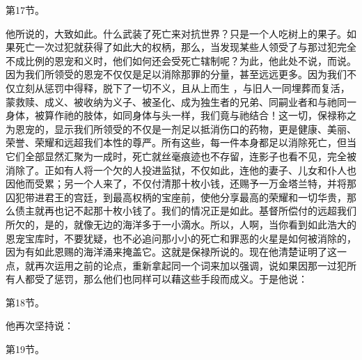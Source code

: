 第17节。 \par

他所说的，大致如此。什么武装了死亡来对抗世界？只是一个人吃树上的果子。如果死亡一次过犯就获得了如此大的权柄，那么，当发现某些人领受了与那过犯完全不成比例的恩宠和义时，他们如何还会受死亡辖制呢？为此，他此处不说，而说。因为我们所领受的恩宠不仅仅是足以消除那罪的分量，甚至远远更多。因为我们不仅立刻从惩罚中得释，脱下了一切不义，且从上而生 ，与旧人一同埋葬而复活，蒙救赎、成义、被收纳为义子、被圣化、成为独生者的兄弟、同嗣业者和与祂同一身体，被算作祂的肢体，如同身体与头一样，我们竟与祂结合！这一切，保禄称之为恩宠的，显示我们所领受的不仅是一剂足以抵消伤口的药物，更是健康、美丽、荣誉、荣耀和远超我们本性的尊严。所有这些，每一件本身都足以消除死亡，但当它们全部显然汇聚为一成时，死亡就丝毫痕迹也不存留，连影子也看不见，完全被消除了。正如有人将一个欠的人投进监狱，不仅如此，连他的妻子、儿女和仆人也因他而受累；另一个人来了，不仅付清那十枚小钱，还赐予一万金塔兰特，并将那囚犯带进君王的宫廷，到最高权柄的宝座前，使他分享最高的荣耀和一切华贵，那么债主就再也记不起那十枚小钱了。我们的情况正是如此。基督所偿付的远超我们所欠的，是的，就像无边的海洋多于一小滴水。所以，人啊，当你看到如此浩大的恩宠宝库时，不要犹疑，也不必追问那小小的死亡和罪恶的火星是如何被消除的，因为有如此恩赐的海洋涌来掩盖它。这就是保禄所说的。现在他清楚证明了这一点，就再次运用之前的论点，重新拿起同一个词来加以强调，说如果因那一过犯所有人都受了惩罚，那么他们也同样可以藉这些手段而成义。于是他说：\par

第18节。 \par

他再次坚持说：\par

第19节。 \par

